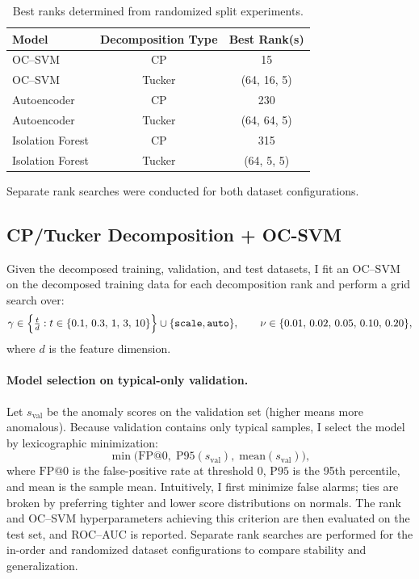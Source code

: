 \documentclass[pdflatex,sn-mathphys-ay]{sn-jnl}
\begin{document}
\begin{table}
\centering
\caption{Best ranks determined from randomized split experiments.}
\label{tab:best-ranks-random}
\begin{tabular}{lcc}
\hline
\textbf{Model} & \textbf{Decomposition Type} & \textbf{Best Rank(s)} \\
\hline
OC--SVM         & CP     & 15 \\
OC--SVM         & Tucker & (64, 16, 5) \\
Autoencoder     & CP     & 230 \\
Autoencoder     & Tucker & (64, 64, 5) \\
Isolation Forest & CP     & 315 \\
Isolation Forest & Tucker & (64, 5, 5) \\
\hline
\end{tabular}
\end{table}

Separate rank searches were conducted for both dataset configurations.


\subsection{CP/Tucker Decomposition + OC-SVM}
Given the decomposed training, validation, and test datasets, I fit an OC\mbox{--}SVM on the decomposed training data for each decomposition rank and perform a grid search over:
\[
\gamma \in \Bigl\{ \tfrac{t}{d} : t \in \{0.1,\,0.3,\,1,\,3,\,10\} \Bigr\} \cup \{\texttt{scale}, \texttt{auto}\},
\qquad
\nu \in \{0.01,\,0.02,\,0.05,\,0.10,\,0.20\},
\]
where \(d\) is the feature dimension.

\paragraph{Model selection on typical-only validation.}
Let \(s_{\text{val}}\) be the anomaly scores on the validation set (higher means more anomalous). Because validation contains only typical samples, I select the model by lexicographic minimization:
\[
\min \bigl(\mathrm{FP}@0,\; \mathrm{P95}(s_{\text{val}}),\; \mathrm{mean}(s_{\text{val}})\bigr),
\]
where \(\mathrm{FP}@0\) is the false-positive rate at threshold \(0\), \(\mathrm{P95}\) is the 95th percentile, and \(\mathrm{mean}\) is the sample mean. Intuitively, I first minimize false alarms; ties are broken by preferring tighter and lower score distributions on normals. The rank and OC\mbox{--}SVM hyperparameters achieving this criterion are then evaluated on the test set, and ROC--AUC is reported. Separate rank searches are performed for the in-order and randomized dataset configurations to compare stability and generalization.
\end{document}

